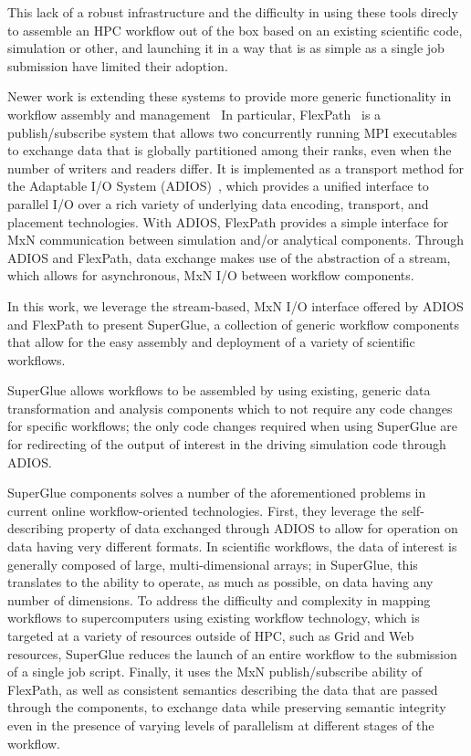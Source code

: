 \documentclass[conference]{IEEEtran}
\begin{document}
This lack of a robust infrastructure and the difficulty in
using these tools direcly to assemble an
HPC workflow out of the box
based on an existing scientific code,
simulation or other,
and launching it in a way that is
as simple as a single job submission
have limited their adoption.

Newer work is extending these
systems to provide more generic functionality
in workflow assembly and
management~\cite{dayal:2014:flexpath,dayal:2015:escience,lofstead:2012:txn,lofstead:2013:txn-pdsw,lofstead:2012:txn-metadata,lofstead:2014:txn,lofstead:2016:superglue}
In particular, FlexPath~\cite{dayal:2014:flexpath}
is a publish/subscribe system that allows
two concurrently running MPI executables to
exchange data that is globally partitioned among
their ranks, even when the number of writers and readers differ.
It is implemented as a transport method for the
Adaptable I/O System (ADIOS)~\cite{lofstead:2009:adaptable},
which provides a unified interface to parallel I/O over a rich
variety of underlying data encoding, transport, and placement technologies.
With ADIOS, FlexPath provides a simple interface for MxN communication
between simulation and/or analytical components.
Through ADIOS and FlexPath, data exchange makes use
of the abstraction of a stream, which allows
for asynchronous, MxN I/O between workflow components.

In this work, we leverage the stream-based, MxN
I/O interface offered by ADIOS and FlexPath
to present SuperGlue, a collection of generic workflow components
that allow for the easy assembly and deployment
of a variety of scientific workflows.

SuperGlue allows workflows to be assembled
by using existing, generic
data transformation and 
analysis components
which to not require any code changes
for specific workflows;
the only code changes required when
using SuperGlue are 
for redirecting of the output of interest
in the driving simulation code through ADIOS.

SuperGlue components solves a number of the aforementioned problems in
current online workflow-oriented technologies.
First, they leverage the self-describing
property of data exchanged through ADIOS to
allow for operation on data having very different formats.
In scientific workflows, the data of interest
is generally composed of large, multi-dimensional
arrays; in SuperGlue, this translates to
the ability to operate, as much as possible,
on data having any number of dimensions.
To address the difficulty and complexity
in mapping workflows to supercomputers using
existing workflow technology, which is targeted
at a variety of resources outside of HPC, such as Grid and Web
resources,
SuperGlue reduces the
launch of an entire workflow to the submission of a single job script.
Finally, it uses the MxN publish/subscribe
ability of FlexPath,
as well as consistent semantics describing
the data that are passed through the components,
to exchange data while preserving semantic integrity
even in the presence of varying levels of parallelism 
at different stages of the workflow.
\end{document}
